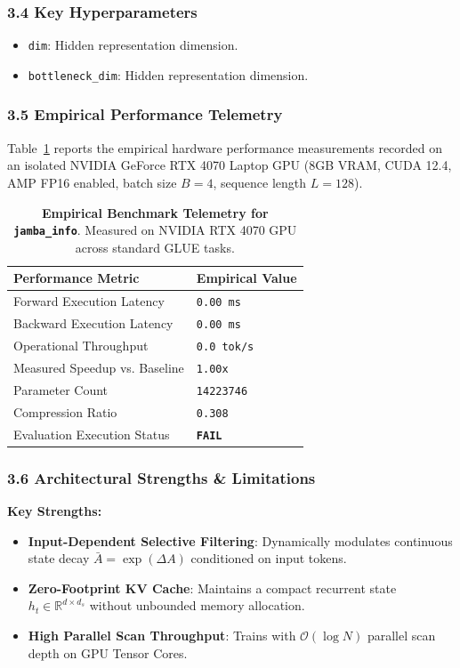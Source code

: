 \subsubsection*{3.4 Key Hyperparameters}
\begin{itemize}
    \item \texttt{dim}: Hidden representation dimension.
    \item \texttt{bottleneck\_dim}: Hidden representation dimension.
\end{itemize}

\subsubsection*{3.5 Empirical Performance Telemetry}
Table~\ref{tab:telemetry_jamba_info} reports the empirical hardware performance measurements recorded on an isolated NVIDIA GeForce RTX 4070 Laptop GPU (8GB VRAM, CUDA 12.4, AMP FP16 enabled, batch size $B=4$, sequence length $L=128$).

\begin{table}[h]
\centering
\small
\caption{\textbf{Empirical Benchmark Telemetry for \texttt{jamba\_info}}. Measured on NVIDIA RTX 4070 GPU across standard GLUE tasks.}
\label{tab:telemetry_jamba_info}
\begin{tabularx}{\columnwidth}{lX}
\toprule
\textbf{Performance Metric} & \textbf{Empirical Value} \\
\midrule
Forward Execution Latency & \texttt{0.00 ms} \\
Backward Execution Latency & \texttt{0.00 ms} \\
Operational Throughput & \texttt{0.0 tok/s} \\
Measured Speedup vs. Baseline & \texttt{1.00x} \\
Parameter Count & \texttt{14223746} \\
Compression Ratio & \texttt{0.308} \\
Evaluation Execution Status & \textbf{\texttt{FAIL}} \\
\bottomrule
\end{tabularx}
\end{table}

\subsubsection*{3.6 Architectural Strengths \& Limitations}
\textbf{Key Strengths:}
\begin{itemize}
    \item \textbf{Input-Dependent Selective Filtering}: Dynamically modulates continuous state decay $\bar{A} = \exp(\Delta A)$ conditioned on input tokens.
    \item \textbf{Zero-Footprint KV Cache}: Maintains a compact recurrent state $h_t \in \mathbb{R}^{d \times d_s}$ without unbounded memory allocation.
    \item \textbf{High Parallel Scan Throughput}: Trains with $\mathcal{O}(\log N)$ parallel scan depth on GPU Tensor Cores.
\end{itemize}


